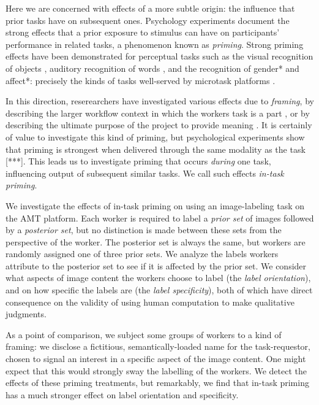 \documentclass[a4paper]{report}
\begin{document}
Here we are concerned with effects of a more subtle origin: the influence that
prior tasks have on subsequent ones.  Psychology experiments document the 
strong effects that a prior exposure to stimulus can have on participants' 
performance in related tasks, a phenomenon known as \textit{priming}.  Strong 
priming effects have been demonstrated for
perceptual tasks such as the visual recognition of 
objects \cite{BJOP:BJOP1796},
auditory recognition of words \cite{BJOP:BJOP1826}, and the recognition
of gender* and affect*: precisely the kinds of tasks well-served by microtask 
platforms \cite{yuen2011survey, snow2008cheap}.  

In this direction, reserearchers have investigated various effects due to 
\textit{framing}, by describing the larger workflow context in which the 
workers task is a part \cite{Kinnaird2012281}, or by describing the ultimate 
purpose of the project to provide meaning \cite{chandler2013breaking}.
It is certainly of value to investigate this kind of priming, but 
psychological experiments show that priming is strongest when 
delivered through the same modality as the task [***].  This leads us to 
investigate priming that occurs \textit{during} one task, influencing output
of subsequent similar tasks. We call such effects \textit{in-task priming}.  

We investigate the effects of in-task priming on using an image-labeling task
on the AMT platform.  Each worker is required to label a \textit{prior set} of
images followed by a \textit{posterior set}, but no distinction is made between
these sets from the perspective of the worker.  The posterior set is
always the same, but workers are randomly assigned one of three prior sets.
We analyze the labels workers attribute to the posterior set to see if it is 
affected by the prior set.  We consider what aspects of image content the 
workers choose to label (the \textit{label orientation}), and on how specific 
the labels are (the \textit{label specificity}), both of which have direct 
consequence on the validity of using human computation to make qualitative 
judgments.

As a point of comparison, we subject some groups of workers to a kind of
framing: we disclose a fictitious, semantically-loaded name for the 
task-requestor, chosen to signal an interest in a specific aspect of the 
image content.  One might expect that this would strongly sway the labelling 
of the workers.  We detect the effects of these priming treatments, but 
remarkably, we find that in-task priming has a much stronger effect on label 
orientation and specificity.  
\end{document}
